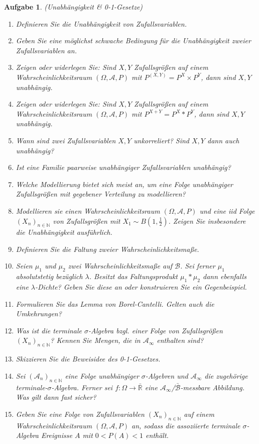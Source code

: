 \documentclass[11pt, a4paper, ngerman]{article}
\newcommand{\N}{\mathbb{N}}
\newcommand{\R}{\mathbb{R}}
\newtheorem{aufgabe}{Aufgabe}
\begin{document}
\begin{aufgabe} (Unabhängigkeit \& 0-1-Gesetze)
   \begin{enumerate}
        \item 
        Definieren Sie die Unabhängigkeit von Zufallsvariablen.
        \item 
        Geben Sie eine möglichst schwache Bedingung für die Unabhängigkeit zweier Zufallsvariablen an. 
        \item 
        Zeigen oder widerlegen Sie: Sind $X,Y$ Zufallsgrößen auf einem Wahrscheinlichkeitsraum $(\Omega, \mathcal{A}, P)$ mit  $P^{(X,Y)} = P^X \times P^Y$, dann sind $X,Y$ unabhängig. 
        \item
        Zeigen oder widerlegen Sie: Sind $X,Y$ Zufallsgrößen auf einem Wahrscheinlichkeitsraum $(\Omega, \mathcal{A}, P)$ mit $P^{X+Y} = P^X * P^Y$, dann sind $X,Y$ unabhängig. 
        \item 
        Wann sind zwei Zufallsvariablen $X,Y$ unkorreliert? Sind $X,Y$ dann auch unabhängig? 
        \item
        Ist eine Familie paarweise unabhängiger Zufallsvariablen unabhängig? 
        \item 
        Welche Modellierung bietet sich meist an, um eine Folge unabhängiger Zufallsgrößen mit gegebener Verteilung zu modellieren? 
        \item 
        Modellieren sie einen Wahrscheinlichkeitsraum $(\Omega, \mathcal{A}, P)$ und eine iid Folge $(X_n)_{n \in \N}$ von Zufallsgrößen mit $X_1 \sim B(1, \frac{1}{2})$. Zeigen Sie insbesondere die Unabhängigkeit ausführlich. 
        \item 
        Definieren Sie die Faltung zweier Wahrscheinlichkeitsmaße. 
        \item 
        Seien $\mu_1$ und $\mu_2$ zwei Wahrscheinlichkeitsmaße auf $\mathcal{B}$. Sei ferner $\mu_1$ absolutstetig bezüglich $\lambda$. Besitzt das Faltungsprodukt $\mu_1 * \mu_2$ dann ebenfalls eine $\lambda$-Dichte? Geben Sie diese an oder konstruieren Sie ein Gegenbeispiel. 
        \item   
        Formulieren Sie das Lemma von Borel-Cantelli. Gelten auch die Umkehrungen? 
        \item
        Was ist die terminale $\sigma$-Algebra bzgl. einer Folge von Zufallsgrößen $(X_n)_{n \in \N}$? Kennen Sie Mengen, die in $\mathcal{A}_{\infty}$ enthalten sind? 
        \item 
        Skizzieren Sie die Beweisidee des 0-1-Gesetzes. 
        \item 
        Sei $(\mathcal{A}_n)_{n \in \N}$ eine Folge unabhängiger $\sigma$-Algebren und $\mathcal{A}_{\infty}$ die zugehörige terminale-$\sigma$-Algebra. Ferner sei $f: \Omega \to \bar{\R}$ eine $\mathcal{A}_{\infty}$/$\bar{\mathcal{B}}$-messbare Abbildung. Was gilt dann fast sicher? 
        \item 
        Geben Sie eine Folge von Zufallsvariablen $(X_n)_{n \in \N}$ auf einem Wahrscheinlichkeitsraum $(\Omega, \mathcal{A}, P)$ an, sodass die assoziierte terminale $\sigma$-Algebra Ereignisse $A$ mit $0 < P(A) < 1$ enthält. 
    \end{enumerate}
    

\end{aufgabe}
\end{document}
